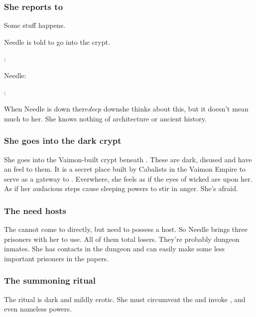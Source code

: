 \begin{garbage}
\subsubsection{She reports to \Achsah}
Some stuff happens. 

Needle is told to go into the crypt. 

\Achsah: 

Needle: 

\Achsah: 

When Needle is down there\dash \emph{deep} down\dash she thinks about this, but it doesn't mean much to her. 
She knows nothing of architecture or ancient history. 





\subsubsection{She goes into the dark crypt}
She goes into the Vaimon-built crypt beneath \CastlePelidor. 
These are dark, disused and have an  feel to them. 
It is a secret place built by Cabalists in the Vaimon Empire to serve as a gateway to \Nyx. 
Everwhere, she feels as if the eyes of wicked \Qliphoth{} are upon her. 
As if her audacious steps cause sleeping powers to stir in anger. 
She's afraid. 





\subsubsection{The \banes{} need \human{} hosts}
The \banes{} cannot come to \Miith{} directly, but need to possess a \human{} host. 
So Needle brings three prisoners with her to use. 
All of them total losers. 
They're probably dungeon inmates. 
She has contacts in the dungeon and can easily make some less important prisoners  in the papers. 





\subsubsection{The summoning ritual}
The ritual is dark and mildly erotic. 
She must circumvent the \Sephiroth{} and invoke \Qliphoth{}, and even nameless powers. 


\end{garbage}
